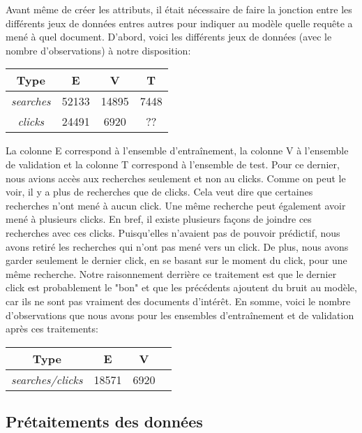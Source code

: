 
Avant même de créer les attributs, il était nécessaire de faire la jonction entre les différents jeux de données entres autres pour indiquer au modèle quelle requête a mené à quel document. 
D'abord, voici les différents jeux de données (avec le nombre d'observations) à notre disposition:

\begin{center}
  \begin{tabular}{ |c|c|c|c| } 
     \hline
     Type & E & V & T \\
     \hline
     \hline
     \textit{searches} & 52133 & 14895 & 7448 \\ 
     \hline
     \textit{clicks} & 24491 & 6920 & ?? \\ 
     \hline
  \end{tabular}
\end{center}

La colonne E correspond à l'ensemble d'entraînement, la colonne V à l'ensemble de validation et la colonne T correspond à l'ensemble de test. 
Pour ce dernier, nous avions accès aux recherches seulement et non au clicks. 
Comme on peut le voir, il y a plus de recherches que de clicks. 
Cela veut dire que certaines recherches n'ont mené à aucun click. 
Une même recherche peut également avoir mené à plusieurs clicks. 
En bref, il existe plusieurs façons de joindre ces recherches avec ces clicks. 
Puisqu'elles n'avaient pas de pouvoir prédictif, nous avons retiré les recherches qui n'ont pas mené vers un click. 
De plus, nous avons garder seulement le dernier click, en se basant sur le moment du click, pour une même recherche. 
Notre raisonnement derrière ce traitement est que le dernier click est probablement le "bon" et que les précédents ajoutent du bruit au modèle, car ils ne sont pas vraiment des documents d'intérêt. 
En somme, voici le nombre d'observations que nous avons pour les ensembles d'entraînement et de validation après ces traitements:

\begin{center}
  \begin{tabular}{ |c|c|c|c| } 
     \hline
     Type & E & V \\
     \hline
     \hline
     \textit{searches/clicks} & 18571 & 6920 \\ 
     \hline
  \end{tabular}
\end{center}

\subsection{Prétaitements des données}

